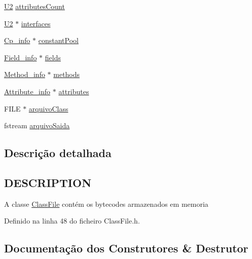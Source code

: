 \begin{DoxyCompactItemize}
\item 
\hyperlink{BasicTypes_8h_a90240657108b1b457eef9d3f76e0202e}{U2} \hyperlink{classClassFile_a66691e77df3f8604eebebc8759953542}{attributes\+Count}
\item 
\hyperlink{BasicTypes_8h_a90240657108b1b457eef9d3f76e0202e}{U2} $\ast$ \hyperlink{classClassFile_a94d1e4e835476f47e3a8b81ecd0301c0}{interfaces}
\item 
\hyperlink{structCp__info}{Cp\+\_\+info} $\ast$ \hyperlink{classClassFile_a5883215e48e253a84c105a18d34049ca}{constant\+Pool}
\item 
\hyperlink{structField__info}{Field\+\_\+info} $\ast$ \hyperlink{classClassFile_a6d6ec8aa668982ea722edc40b3ea5b1a}{fields}
\item 
\hyperlink{structMethod__info}{Method\+\_\+info} $\ast$ \hyperlink{classClassFile_a5906980e6c5121e5a864346fd3617083}{methods}
\item 
\hyperlink{structAttribute__info}{Attribute\+\_\+info} $\ast$ \hyperlink{classClassFile_a20d4b18030becbd8df5b7584477e94b6}{attributes}
\item 
F\+I\+LE $\ast$ \hyperlink{classClassFile_ae2be12dcc1a042970b4d7d7cf9709624}{arquivo\+Class}
\item 
fstream \hyperlink{classClassFile_a4aee6c7763d46884d5b2c0297142df99}{arquivo\+Saida}
\end{DoxyCompactItemize}


\subsection{Descrição detalhada}
\hypertarget{classClassFile_DESCRIPTION}{}\subsection{D\+E\+S\+C\+R\+I\+P\+T\+I\+ON}\label{classClassFile_DESCRIPTION}
A classe \hyperlink{classClassFile}{Class\+File} contém os bytecodes armazenados em memoria 

Definido na linha 48 do ficheiro Class\+File.\+h.



\subsection{Documentação dos Construtores \& Destrutor}
\mbox{\label{classClassFile_a7cf76bcaf785b984e9d1b31d52a5aa7f}} 
